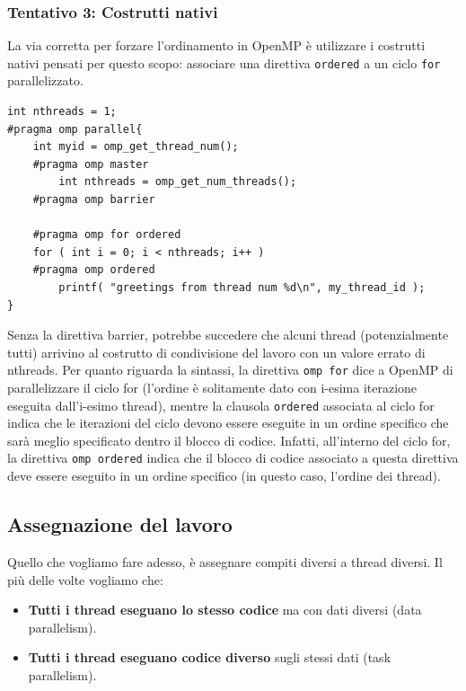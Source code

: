 \subsubsection*{Tentativo 3: Costrutti nativi}
La via corretta per forzare l'ordinamento in OpenMP è utilizzare i costrutti nativi pensati per questo scopo: associare una direttiva \texttt{ordered} a un ciclo \texttt{for} parallelizzato.

\begin{verbatim}
int nthreads = 1;
#pragma omp parallel{
    int myid = omp_get_thread_num();
    #pragma omp master
        int nthreads = omp_get_num_threads();
    #pragma omp barrier
    
    #pragma omp for ordered
    for ( int i = 0; i < nthreads; i++ )
    #pragma omp ordered
        printf( "greetings from thread num %d\n", my_thread_id );
}
\end{verbatim}
Senza la direttiva barrier, potrebbe succedere che alcuni thread (potenzialmente tutti) arrivino al costrutto di condivisione del lavoro con un valore errato di nthreads.
Per quanto riguarda la sintassi, la direttiva \texttt{omp for} dice a OpenMP di parallelizzare il ciclo for (l'ordine è solitamente dato con i-esima iterazione eseguita dall'i-esimo thread), mentre la clausola \texttt{ordered} associata al ciclo for indica che le iterazioni del ciclo devono essere eseguite in un ordine specifico che sarà meglio specificato dentro il blocco di codice. Infatti, all'interno del ciclo for, la direttiva \texttt{omp ordered} indica che il blocco di codice associato a questa direttiva deve essere eseguito in un ordine specifico (in questo caso, l'ordine dei thread).

\subsection{Assegnazione del lavoro} 
Quello che vogliamo fare adesso, è assegnare compiti diversi a thread diversi. Il più delle volte vogliamo che:
\begin{itemize}
    \item \textbf{Tutti i thread eseguano lo stesso codice} ma con dati diversi (data parallelism).
    \item \textbf{Tutti i thread eseguano codice diverso} sugli stessi dati (task parallelism).
\end{itemize}

